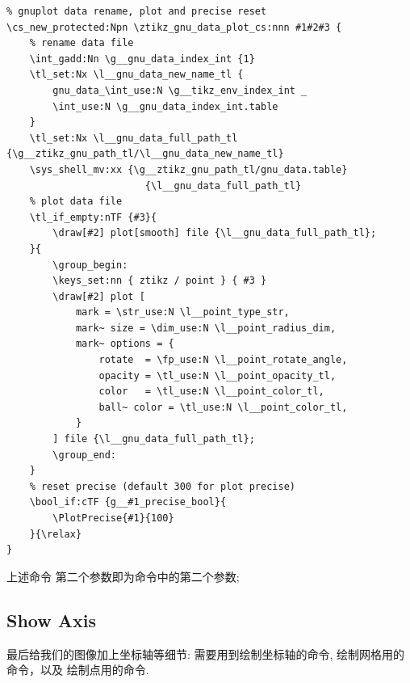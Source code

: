 \begin{verbatim}
% gnuplot data rename, plot and precise reset
\cs_new_protected:Npn \ztikz_gnu_data_plot_cs:nnn #1#2#3 {
    % rename data file
    \int_gadd:Nn \g__gnu_data_index_int {1}
    \tl_set:Nx \l__gnu_data_new_name_tl {
        gnu_data_\int_use:N \g__tikz_env_index_int _
        \int_use:N \g__gnu_data_index_int.table
    }
    \tl_set:Nx \l__gnu_data_full_path_tl {\g__ztikz_gnu_path_tl/\l__gnu_data_new_name_tl}
    \sys_shell_mv:xx {\g__ztikz_gnu_path_tl/gnu_data.table}
                        {\l__gnu_data_full_path_tl}
    % plot data file
    \tl_if_empty:nTF {#3}{
        \draw[#2] plot[smooth] file {\l__gnu_data_full_path_tl};
    }{
        \group_begin:
        \keys_set:nn { ztikz / point } { #3 }
        \draw[#2] plot [
            mark = \str_use:N \l__point_type_str, 
            mark~ size = \dim_use:N \l__point_radius_dim,
            mark~ options = {
                rotate  = \fp_use:N \l__point_rotate_angle, 
                opacity = \tl_use:N \l__point_opacity_tl, 
                color   = \tl_use:N \l__point_color_tl,
                ball~ color = \tl_use:N \l__point_color_tl,
            }
        ] file {\l__gnu_data_full_path_tl};
        \group_end:
    }
    % reset precise (default 300 for plot precise)
    \bool_if:cTF {g__#1_precise_bool}{
        \PlotPrecise{#1}{100}
    }{\relax}
}
\end{verbatim}

上述命令  第二个参数即为\cmd{\Plot}命令中的第二个参数;

\subsection{Show Axis}
最后给我们的图像加上坐标轴等细节: 需要用到绘制坐标轴的\cmd{\ShowAxis}命令, 绘制网格用的\cmd{\ShowGrid}命令，以及
绘制点用的\cmd{\ShowPoint}命令.

